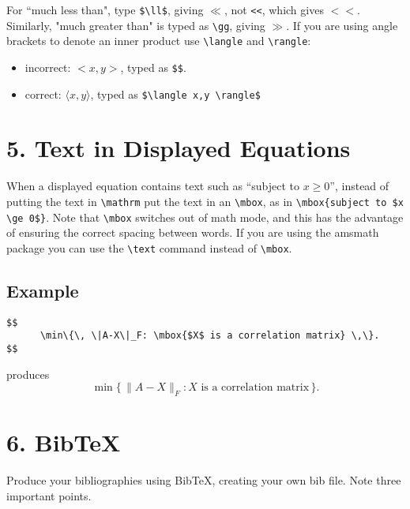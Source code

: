 \documentclass[12pt]{extarticle}
\begin{document}
For ``much less than", type \verb"$\ll$", giving $\ll$, 
not \verb"<<", which gives $<<$.
Similarly, "much greater than" is typed as \texttt{\textbackslash{}gg}, giving $\gg$.
If you are using angle brackets to denote an inner product
use \texttt{\textbackslash{}langle} and \texttt{\textbackslash{}rangle}:

\begin{itemize}
\item incorrect: $<x,y>$, typed as  \texttt{\$<x,y>\$}.
\item correct: $\langle x,y \rangle$, typed as \texttt{\$\textbackslash{}langle x,y \textbackslash{}rangle\$}
\end{itemize}

\section*{5. Text in Displayed Equations}
\label{sec-6}
When a displayed equation contains text such as 
``subject to $x \ge 0$'',
instead of putting the text in \texttt{\textbackslash{}mathrm} put the text in an
\texttt{\textbackslash{}mbox}, as in 
\texttt{\textbackslash{}mbox\{subject to \$x \textbackslash{}ge 0\$\}}.
Note that \texttt{\textbackslash{}mbox} switches out of math mode,
and this has the advantage of ensuring the correct spacing between words.
If you are using the amsmath package you can use the \texttt{\textbackslash{}text} command
instead of \texttt{\textbackslash{}mbox}.
\subsection*{Example}
\label{sec-6-1}
\begin{verbatim}
$$
      \min\{\, \|A-X\|_F: \mbox{$X$ is a correlation matrix} \,\}.
$$
\end{verbatim}
produces
$$
   \min\{\, \|A-X\|_F: \mbox{$X$ is a correlation matrix} \,\}.
$$
\section*{6. BibTeX}
\label{sec-7}
Produce your bibliographies using BibTeX, creating your own bib file.
Note three important points.
\end{document}
